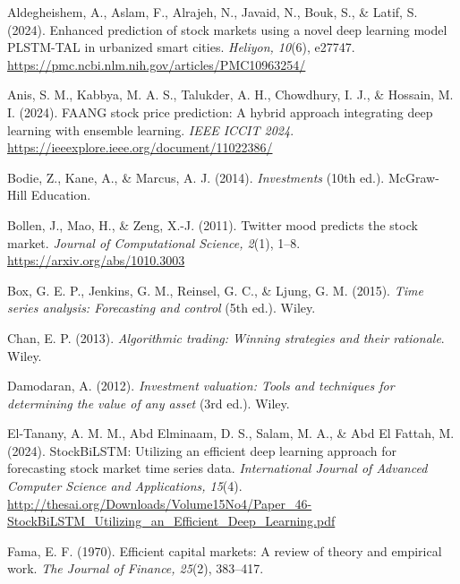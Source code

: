 \documentclass[12pt,a4paper]{report}
\numberwithin{equation}{chapter}
\begin{document}
\begin{list}{}{
  \setlength{\leftmargin}{0.5in}
  \setlength{\itemindent}{-0.5in}
  \setlength{\itemsep}{4pt}
  \setlength{\parsep}{0pt}
  \setlength{\topsep}{2pt}
}
\sloppy

\item Aldegheishem, A., Aslam, F., Alrajeh, N., Javaid, N., Bouk, S., \& Latif, S. (2024). Enhanced prediction of stock markets using a novel deep learning model PLSTM-TAL in urbanized smart cities. \textit{Heliyon, 10}(6), e27747. \url{https://pmc.ncbi.nlm.nih.gov/articles/PMC10963254/}

\item Anis, S. M., Kabbya, M. A. S., Talukder, A. H., Chowdhury, I. J., \& Hossain, M. I. (2024). FAANG stock price prediction: A hybrid approach integrating deep learning with ensemble learning. \textit{IEEE ICCIT 2024}. \url{https://ieeexplore.ieee.org/document/11022386/}

\item Bodie, Z., Kane, A., \& Marcus, A. J. (2014). \textit{Investments} (10th ed.). McGraw-Hill Education.

\item Bollen, J., Mao, H., \& Zeng, X.-J. (2011). Twitter mood predicts the stock market. \textit{Journal of Computational Science, 2}(1), 1--8. \url{https://arxiv.org/abs/1010.3003}

\item Box, G. E. P., Jenkins, G. M., Reinsel, G. C., \& Ljung, G. M. (2015). \textit{Time series analysis: Forecasting and control} (5th ed.). Wiley.

\item Chan, E. P. (2013). \textit{Algorithmic trading: Winning strategies and their rationale}. Wiley.

\item Damodaran, A. (2012). \textit{Investment valuation: Tools and techniques for determining the value of any asset} (3rd ed.). Wiley.

\item El-Tanany, A. M. M., Abd Elminaam, D. S., Salam, M. A., \& Abd El Fattah, M. (2024). StockBiLSTM: Utilizing an efficient deep learning approach for forecasting stock market time series data. \textit{International Journal of Advanced Computer Science and Applications, 15}(4). \url{http://thesai.org/Downloads/Volume15No4/Paper_46-StockBiLSTM_Utilizing_an_Efficient_Deep_Learning.pdf}

\item Fama, E. F. (1970). Efficient capital markets: A review of theory and empirical work. \textit{The Journal of Finance, 25}(2), 383--417.


\end{list}
\end{document}
